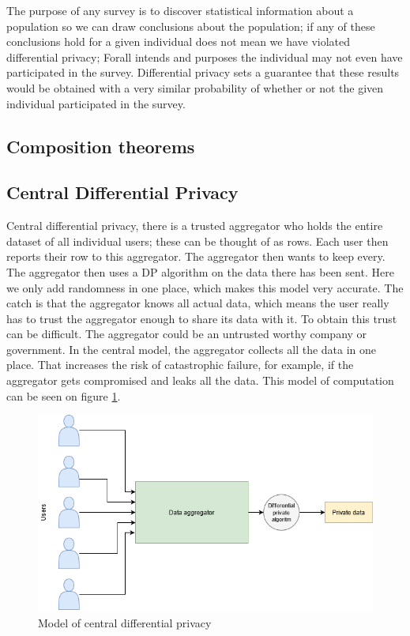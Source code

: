 \documentclass[11pt]{article}
\theoremstyle{definition}
\begin{document}
The purpose of any survey is to discover statistical information about a population so we can draw conclusions about the population; if any of these conclusions hold for a given individual does not mean we have violated differential privacy; Forall intends and purposes the individual may not even have participated in the survey. Differential privacy sets a guarantee that these results would be obtained with a very similar probability of whether or not the given individual participated in the survey.

\subsection{Composition theorems}

\subsection{Central Differential Privacy}
Central differential privacy, there is a trusted aggregator who holds the entire dataset of all individual users; these can be thought of as rows. Each user then reports their row to this aggregator. The aggregator then wants to keep every. The aggregator then uses a DP algorithm on the data there has been sent. Here we only add randomness in one place, which makes this model very accurate. The catch is that the aggregator knows all actual data, which means the user really has to trust the aggregator enough to share its data with it. To obtain this trust can be difficult. The aggregator could be an untrusted worthy company or government. In the central model, the aggregator collects all the data in one place. That increases the risk of catastrophic failure, for example, if the aggregator gets compromised and leaks all the data.
This model of computation can be seen on figure \ref{fig:model_cen_dp}.
\begin{figure}[H]
    \centering
    \includegraphics[width = .8\textwidth]{figures/DP_cen.png}
    \caption{Model of central differential privacy}
    \label{fig:model_cen_dp}
\end{figure}
\end{document}
